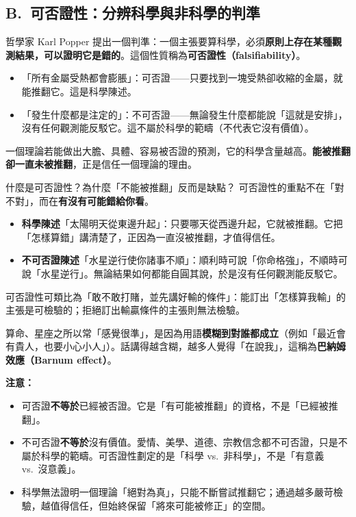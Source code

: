 \documentclass[11pt]{article}
\begin{document}
\subsection*{\sffamily B.\ 可否證性：分辨科學與非科學的判準}

哲學家 Karl Popper 提出一個判準：一個主張要算科學，必須\textbf{原則上存在某種觀測結果，可以證明它是錯的}。這個性質稱為\textbf{可否證性（falsifiability）}。

\begin{itemize}\setlength{\itemsep}{1pt}
\item 「所有金屬受熱都會膨脹」：可否證——只要找到一塊受熱卻收縮的金屬，就能推翻它。這是科學陳述。
\item 「發生什麼都是注定的」：不可否證——無論發生什麼都能說「這就是安排」，沒有任何觀測能反駁它。這不屬於科學的範疇（不代表它沒有價值）。
\end{itemize}

一個理論若能做出大膽、具體、容易被否證的預測，它的科學含量越高。\textbf{能被推翻卻一直未被推翻}，正是信任一個理論的理由。

\begin{補充框}{什麼是可否證性？為什麼「不能被推翻」反而是缺點？}
可否證性的重點不在「對不對」，而在\textbf{有沒有可能錯給你看}。

\begin{itemize}\setlength{\itemsep}{1pt}
\item \textbf{科學陳述}「太陽明天從東邊升起」：只要哪天從西邊升起，它就被推翻。它把「怎樣算錯」講清楚了，正因為一直沒被推翻，才值得信任。
\item \textbf{不可否證陳述}「水星逆行使你諸事不順」：順利時可說「你命格強」，不順時可說「水星逆行」。無論結果如何都能自圓其說，於是沒有任何觀測能反駁它。
\end{itemize}

可否證性可類比為「敢不敢打賭，並先講好輸的條件」：能訂出「怎樣算我輸」的主張是可檢驗的；拒絕訂出輸贏條件的主張則無法檢驗。

算命、星座之所以常「感覺很準」，是因為用語\textbf{模糊到對誰都成立}（例如「最近會有貴人，也要小心小人」）。話講得越含糊，越多人覺得「在說我」，這稱為\textbf{巴納姆效應（Barnum effect）}。

\textbf{注意：}
\begin{itemize}\setlength{\itemsep}{1pt}
\item 可否證\textbf{不等於}已經被否證。它是「有可能被推翻」的資格，不是「已經被推翻」。
\item 不可否證\textbf{不等於}沒有價值。愛情、美學、道德、宗教信念都不可否證，只是不屬於科學的範疇。可否證性劃定的是「科學 vs.\ 非科學」，不是「有意義 vs.\ 沒意義」。
\item 科學無法證明一個理論「絕對為真」，只能不斷嘗試推翻它；通過越多嚴苛檢驗，越值得信任，但始終保留「將來可能被修正」的空間。
\end{itemize}
\end{補充框}
\end{document}
